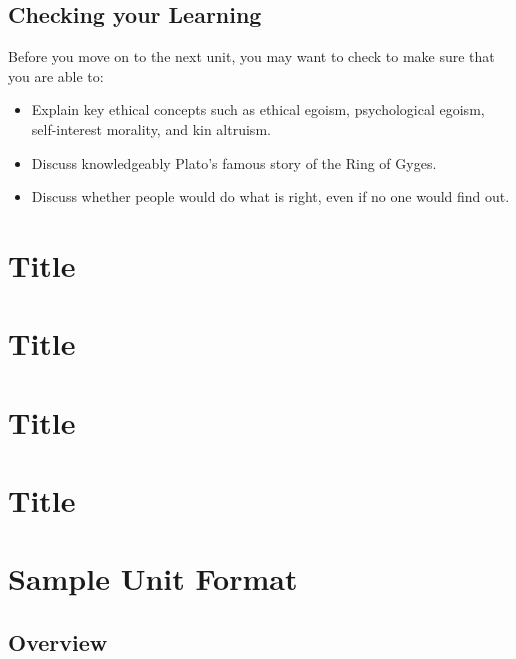 \documentclass[
]{book}
\providecommand{\tightlist}{%
  \setlength{\itemsep}{0pt}\setlength{\parskip}{0pt}}
\begin{document}
\hypertarget{checking-your-learning-1}{%
\section*{Checking your Learning}\label{checking-your-learning-1}}

\begin{progress}
Before you move on to the next unit, you may want to check to make sure that you are able to:

\begin{itemize}
\tightlist
\item
  Explain key ethical concepts such as ethical egoism, psychological egoism, self-interest morality, and kin altruism.
\item
  Discuss knowledgeably Plato's famous story of the Ring of Gyges.
\item
  Discuss whether people would do what is right, even if no one would find out.
\end{itemize}
\end{progress}

\hypertarget{title}{%
\chapter{Title}\label{title}}

\hypertarget{title-1}{%
\chapter{Title}\label{title-1}}

\hypertarget{title-2}{%
\chapter{Title}\label{title-2}}

\hypertarget{title-3}{%
\chapter{Title}\label{title-3}}

\hypertarget{sample-unit-format}{%
\chapter{Sample Unit Format}\label{sample-unit-format}}

\hypertarget{overview-2}{%
\section*{Overview}\label{overview-2}}
\end{document}
